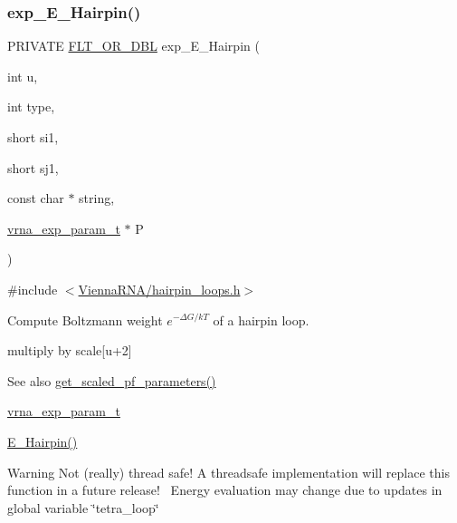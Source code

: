 \subsubsection{\texorpdfstring{exp\+\_\+\+E\+\_\+\+Hairpin()}{exp\_E\_Hairpin()}}
{\footnotesize\ttfamily P\+R\+I\+V\+A\+TE \hyperlink{group__data__structures_ga31125aeace516926bf7f251f759b6126}{F\+L\+T\+\_\+\+O\+R\+\_\+\+D\+BL} exp\+\_\+\+E\+\_\+\+Hairpin (\begin{DoxyParamCaption}\item[{int}]{u,  }\item[{int}]{type,  }\item[{short}]{si1,  }\item[{short}]{sj1,  }\item[{const char $\ast$}]{string,  }\item[{\hyperlink{group__energy__parameters_ga01d8b92fe734df8d79a6169482c7d8d8}{vrna\+\_\+exp\+\_\+param\+\_\+t} $\ast$}]{P }\end{DoxyParamCaption})}



{\ttfamily \#include $<$\hyperlink{hairpin__loops_8h}{Vienna\+R\+N\+A/hairpin\+\_\+loops.\+h}$>$}



Compute Boltzmann weight $e^{-\Delta G/kT} $ of a hairpin loop. 

multiply by scale\mbox{[}u+2\mbox{]} \begin{DoxySeeAlso}{See also}
\hyperlink{group__energy__parameters_gabf3b9271c41dd3fac02d56e0b02b3344}{get\+\_\+scaled\+\_\+pf\+\_\+parameters()} 

\hyperlink{group__energy__parameters_ga01d8b92fe734df8d79a6169482c7d8d8}{vrna\+\_\+exp\+\_\+param\+\_\+t} 

\hyperlink{group__loops_gadf943ee9a45b7f4cee9192c06210dace}{E\+\_\+\+Hairpin()} 
\end{DoxySeeAlso}
\begin{DoxyWarning}{Warning}
Not (really) thread safe! A threadsafe implementation will replace this function in a future release!~\newline
Energy evaluation may change due to updates in global variable \char`\"{}tetra\+\_\+loop\char`\"{}
\end{DoxyWarning}

